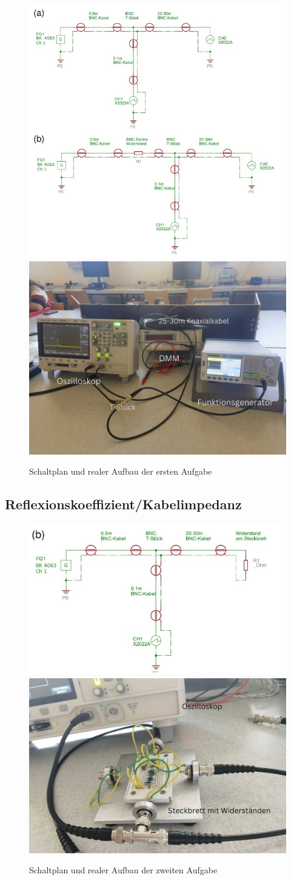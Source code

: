 \documentclass[12pt,a4paper,twoside]{article}
\begin{document}
\begin{figure}[H]
    \centering
    \includegraphics[width=0.4\linewidth]{nudes/Aufgabe 1 Schaltplan.jpg}
    \includegraphics[width=0.4\linewidth]{nudes/Aufbau1.jpg}
    \caption{Schaltplan und realer Aufbau der ersten Aufgabe}
    \label{fig:Aufbau1}
\end{figure}

\subsection{Reflexionskoeffizient/Kabelimpedanz}

\begin{figure}[H]
    \centering
    \includegraphics[width=0.4\linewidth]{nudes/Aufgabe 2,3 Schaltplan.jpg}
    \includegraphics[width=0.4\linewidth]{nudes/Aufbau2.jpg}
    \caption{Schaltplan und realer Aufbau der zweiten Aufgabe}
    \label{fig:Aufbau2}
\end{figure}
\end{document}
